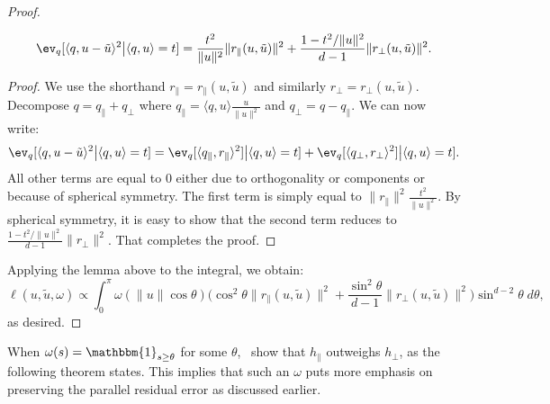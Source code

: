 \begin{proof}
\begin{lemma}
\begin{equation*}
    \ev_q[\langle q, u - \tilde{u} \rangle^2 \big| \langle q, u \rangle = t] = 
    \frac{t^2}{\lVert u \rVert^2} \lVert r_\parallel(u, \tilde{u}) \rVert^2 +
    \frac{1 - t^2/\lVert u \rVert^2}{d - 1} \rVert r_\perp(u, \tilde{u}) \rVert^2.
\end{equation*}
\end{lemma}
\begin{proof}
    We use the shorthand $r_\parallel = r_\parallel(u, \tilde{u})$ and similarly
    $r_\perp = r_\perp(u, \tilde{u})$.
    Decompose $q = q_\parallel + q_\perp$ where $q_\parallel = \langle q, u \rangle \frac{u}{\lVert u \rVert^2}$ and $q_\perp = q - q_\parallel$. We can now write:
    \begin{align*}
        \ev_q[\langle q, u - \tilde{u} \rangle^2 \big| \langle q, u \rangle = t] =
        \ev_q[\langle q_\parallel, r_\parallel \rangle^2] \big| \langle q, u \rangle = t] +
        \ev_q[\langle q_\perp, r_\perp \rangle^2] \big| \langle q, u \rangle = t].
    \end{align*}
    All other terms are equal to $0$ either due to orthogonality or components or because of
    spherical symmetry. The first term is simply equal to
    $\lVert r_\parallel \rVert^2 \frac{t^2}{\lVert u \rVert^2}$.
    By spherical symmetry, it is easy to show that the second term reduces to
    $\frac{1 - t^2/\lVert u \rVert^2}{d - 1} \lVert r_\perp \rVert^2$.
    That completes the proof.
\end{proof}

Applying the lemma above to the integral, we obtain:
\begin{equation*}
    \ell(u, \tilde{u}, \omega) \propto \int_0^\pi \omega(\lVert u \rVert \cos \theta) 
    \Bigg(
    \cos^2 \theta \lVert r_\parallel(u, \tilde{u}) \rVert^2 + \frac{\sin^2 \theta}{d - 1} \lVert r_\perp(u, \tilde{u}) \rVert^2
    \Bigg)
    \sin^{d-2}\theta \; d\theta,
\end{equation*}
as desired.
\end{proof}

When $\omega(s) = \mathbbm{1}_{s \geq \theta}$ for some $\theta$,~\cite{scann} show that
$h_\parallel$ outweighs $h_\perp$, as the following theorem states. This implies that
such an $\omega$ puts more emphasis on preserving the parallel residual error as discussed earlier.


